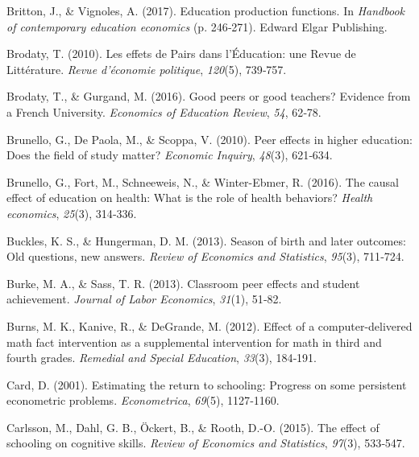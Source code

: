 \documentclass[
]{book}
\newlength{\cslhangindent}
\newlength{\cslentryspacingunit} %
\newenvironment{CSLReferences}[2] %
 {%
  \setlength{\parindent}{0pt}
  \ifodd #1
  \let\oldpar\par
  \def\par{\hangindent=\cslhangindent\oldpar}
  \fi
  \setlength{\parskip}{#2\cslentryspacingunit}
 }%
 {}
\begin{document}
\begin{CSLReferences}{1}{2}
\leavevmode{}%
Britton, J., \& Vignoles, A. (2017). Education production functions. In \emph{Handbook of contemporary education economics} (p. 246‑271). Edward Elgar Publishing.

\leavevmode{}%
Brodaty, T. (2010). Les effets de Pairs dans l'{É}ducation: une Revue de Litt{é}rature. \emph{Revue d'{é}conomie politique}, \emph{120}(5), 739‑757.

\leavevmode{}%
Brodaty, T., \& Gurgand, M. (2016). Good peers or good teachers? Evidence from a French University. \emph{Economics of Education Review}, \emph{54}, 62‑78.

\leavevmode{}%
Brunello, G., De Paola, M., \& Scoppa, V. (2010). Peer effects in higher education: Does the field of study matter? \emph{Economic Inquiry}, \emph{48}(3), 621‑634.

\leavevmode{}%
Brunello, G., Fort, M., Schneeweis, N., \& Winter-Ebmer, R. (2016). The causal effect of education on health: What is the role of health behaviors? \emph{Health economics}, \emph{25}(3), 314‑336.

\leavevmode{}%
Buckles, K. S., \& Hungerman, D. M. (2013). Season of birth and later outcomes: Old questions, new answers. \emph{Review of Economics and Statistics}, \emph{95}(3), 711‑724.

\leavevmode{}%
Burke, M. A., \& Sass, T. R. (2013). Classroom peer effects and student achievement. \emph{Journal of Labor Economics}, \emph{31}(1), 51‑82.

\leavevmode{}%
Burns, M. K., Kanive, R., \& DeGrande, M. (2012). Effect of a computer-delivered math fact intervention as a supplemental intervention for math in third and fourth grades. \emph{Remedial and Special Education}, \emph{33}(3), 184‑191.

\leavevmode{}%
Card, D. (2001). Estimating the return to schooling: Progress on some persistent econometric problems. \emph{Econometrica}, \emph{69}(5), 1127‑1160.

\leavevmode{}%
Carlsson, M., Dahl, G. B., Öckert, B., \& Rooth, D.-O. (2015). The effect of schooling on cognitive skills. \emph{Review of Economics and Statistics}, \emph{97}(3), 533‑547.


\end{CSLReferences}
\end{document}
